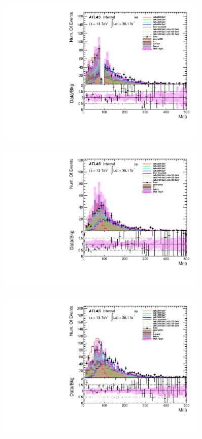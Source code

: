 \begin{figure}[h]
\begin{minipage}[t]{0.33\linewidth}
 \end{minipage}
 \begin{minipage}[t]{0.33\linewidth}
 \centering
 \includegraphics[width=0.9\textwidth,angle=-90]{fig/dataMC_low_Njet_CR/m_ll_ee.pdf}
 \label{fig:dataMC_low_Njet_CR:m_ll_ee.pdf}
 \end{minipage}
 \begin{minipage}[t]{0.33\linewidth}
 \centering
 \includegraphics[width=0.9\textwidth,angle=-90]{fig/dataMC_low_Njet_CR/m_ll_mumu.pdf}
 \label{fig:dataMC_low_Njet_CR:m_ll_mumu.pdf}
 \end{minipage}
  \begin{minipage}[t]{0.33\linewidth}
 \centering
 \includegraphics[width=0.9\textwidth,angle=-90]{fig/dataMC_low_Njet_CR/m_ll_emu.pdf}

\end{minipage}
\end{figure}
